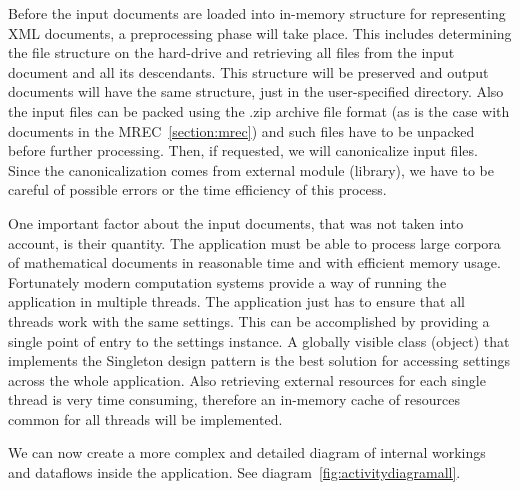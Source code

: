 \documentclass[11pt,oneside,final]{fithesis2}
\begin{document}
Before the input documents are loaded into in-memory structure for representing XML documents, a preprocessing phase will take place. This includes determining the file structure on the hard-drive and retrieving all files from the input document and all its descendants. This structure will be preserved and output documents will have the same structure, just in the user-specified directory. Also the input files can be packed using the .zip archive file format (as is the case with documents in the MREC~\ref{section:mrec}) and such files have to be unpacked before further processing. Then, if requested, we will canonicalize input files. Since the canonicalization comes from external module (library), we have to be careful of possible errors or the time efficiency of this process. 

One important factor about the input documents, that was not taken into account, is their quantity. The application must be able to process large corpora of mathematical documents in reasonable time and with efficient memory usage. Fortunately modern computation systems provide a way of running the application in multiple threads. The application just has to ensure that all threads work with the same settings. This can be accomplished by providing a single point of entry to the settings instance. A globally visible class (object) that implements the Singleton design pattern is the best solution for accessing settings across the whole application. Also retrieving external resources for each single thread is very time consuming, therefore an in-memory cache of resources common for all threads will be implemented.

We can now create a more complex and detailed diagram of internal workings and dataflows inside the application. See diagram~\vref{fig:activitydiagramall}. 
\end{document}
